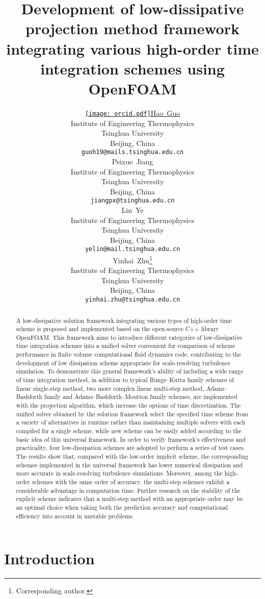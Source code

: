 \documentclass{article}
\title{Development of low-dissipative projection method framework integrating various high-order time integration schemes using OpenFOAM}
\author
{%
  \href{https://orcid.org/0000-0001-6232-690}{\texttt{[image: orcid.pdf]}\hspace{1mm}Hao~Guo} \\
	Institute of Engineering Thermophysics \\
	Tsinghua University \\
	Beijing, China \\
	\texttt{guoh19@mails.tsinghua.edu.cn} \\
  \AND
  Peixue~Jiang \\
  Institute of Engineering Thermophysics \\
  Tsinghua University \\
	Beijing, China \\
  \texttt{jiangpx@tsinghua.edu.cn} \\
	\And
	Lin~Ye \\
  Institute of Engineering Thermophysics\\
	Tsinghua University \\
	Beijing, China \\
	\texttt{yelin@mail.tsinghua.edu.cn} \\
	\And
  Yinhai~Zhu\thanks{Corresponding author.} \\
	Institute of Engineering Thermophysics\\
	Tsinghua University \\
	Beijing, China \\
	\texttt{yinhai.zhu@tsinghua.edu.cn} \\
}
\begin{document}
\maketitle

\begin{abstract}
	A low-dissipative solution framework integrating various types of high-order time scheme is proposed and implemented based on the open-source C++ library OpenFOAM. This framework aims to introduce different categories of low-dissipative time integration schemes into a unified solver convenient for comparison of scheme performance in finite volume computational fluid dynamics code, contributing to the development of low dissipation scheme appropriate for scale-resolving turbulence simulation. To demonstrate this general framework's ability of including a wide range of time integration method, in addition to typical Runge--Kutta family schemes of linear single-step method, two more complex linear multi-step method, Adams--Bashforth family and Adams--Bashforth--Moutton family schemes, are implemented with the projection algorithm, which increase the options of time discretization. The unified solver obtained by the solution framework select the specified time scheme from a variety of alternatives in runtime rather than maintaining multiple solvers with each compiled for a single scheme, while new scheme can be easily added according to the basic idea of this universal framework. In order to verify framework's effectiveness and practicality, four low-dissipation schemes are adopted to perform a series of test cases. The results show that, compared with the low-order implicit scheme, the corresponding schemes implemented in the universal framework has lower numerical dissipation and more accurate in scale-resolving turbulence simulations. Moreover, among the high-order schemes with the same order of accuracy, the multi-step schemes exhibit a considerable advantage in computation time. Further research on the stability of the explicit scheme indicates that a multi-step method with an appropriate order may be an optimal choice when taking both the prediction accuracy and computational efficiency into account in unstable problems.
\end{abstract}




\section{Introduction}
\end{document}
